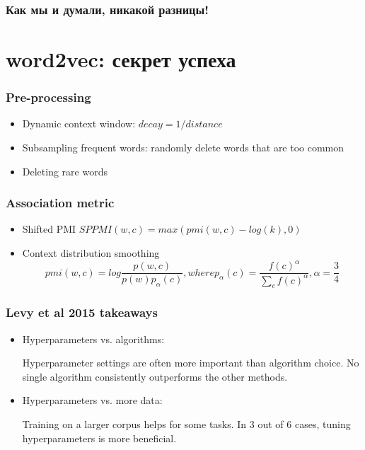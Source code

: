 \documentclass[10pt,svgnames]{beamer}
\begin{document}
\begin{frame}
  \frametitle{Как мы и думали, никакой разницы!}
\end{frame}




\section{word2vec: секрет успеха}



\begin{frame}
  \frametitle{Pre-processing}
  \begin{itemize}
  \item Dynamic context window:  $decay = 1/distance$
  \item Subsampling frequent words: randomly delete words that are too
    common
  \item Deleting rare words
  \end{itemize}
\end{frame}

\begin{frame}
  \frametitle{Association metric}
  \begin{itemize}
  \item Shifted PMI $SPPMI(w, c) = max(pmi(w,c) - log(k), 0)$
  \item Context distribution smoothing
    $$
    pmi(w,c) = log \frac{p(w,c)}{p(w)p_{\alpha}(c)}, where
    p_{\alpha}(c) = \frac{f(c)^{\alpha}}{\sum_{c} f(c)^{\alpha}}, \alpha = \frac{3}{4}
    $$
  \end{itemize}
\end{frame}


\begin{frame}
  \frametitle{Levy et al 2015 takeaways}
  \begin{itemize}
  \item 
    Hyperparameters vs. algorithms:
    
    Hyperparameter settings are often more important than algorithm choice.
    No single algorithm consistently outperforms the other methods.
  \item Hyperparameters vs. more data:
    
    Training on a larger corpus helps for some tasks.
    In 3 out of 6 cases, tuning hyperparameters is more beneficial.
  \end{itemize}
\end{frame}
\end{document}
